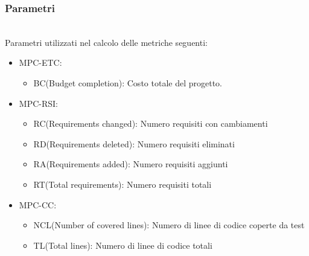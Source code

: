 \subsubsection{Parametri}\mbox{}\\
Parametri utilizzati nel calcolo delle metriche seguenti:
\begin{itemize}
    \item MPC-ETC:
          \begin{itemize}
              \item BC(Budget completion): Costo totale del progetto.
          \end{itemize}
    \item MPC-RSI:
          \begin{itemize}
              \item RC(Requirements changed): Numero requisiti con cambiamenti
              \item RD(Requirements deleted): Numero requisiti eliminati
              \item RA(Requirements added): Numero requisiti aggiunti
              \item RT(Total requirements): Numero requisiti totali
          \end{itemize}

    \item MPC-CC:
          \begin{itemize}
              \item NCL(Number of covered lines): Numero di linee di codice coperte da test
              \item TL(Total lines): Numero di linee di codice totali
          \end{itemize}
\end{itemize}

